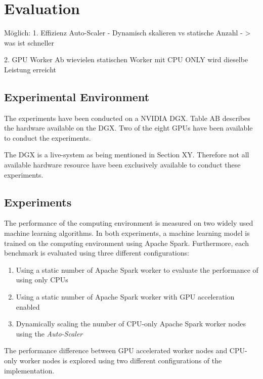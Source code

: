\chapter{Evaluation}
\label{chap:07_evaluation}
%

Möglich:
1. Effizienz Auto-Scaler
- Dynamisch skalieren vs statische Anzahl - > was ist schneller

2. GPU Worker
Ab wievielen statischen Worker mit CPU ONLY wird dieselbe Leistung erreicht

\section{Experimental Environment}
The experiments have been conducted on a NVIDIA DGX.
Table AB describes the hardware available on the DGX.
Two of the eight GPUs have been available to conduct the experiments.


The DGX is a live-system as being mentioned in Section XY. Therefore not all available hardware resource have been exclusively available to conduct these experiments.

\section{Experiments}
The performance of the computing environment is measured on two widely used machine learning algorithms.
In both experiments, a machine learning model is trained on the computing environment using Apache Spark. Furthermore, each benchmark is evaluated using three different configurations:
\begin{enumerate}
\item Using a static number of Apache Spark worker to evaluate the performance of using only CPUs 
\item Using a static number of Apache Spark worker with GPU acceleration enabled
\item Dynamically scaling the number of CPU-only Apache Spark worker nodes using the \textit{Auto-Scaler}
\end{enumerate}
The performance difference between GPU accelerated worker nodes and CPU-only worker nodes is explored using two different configurations of the implementation.


